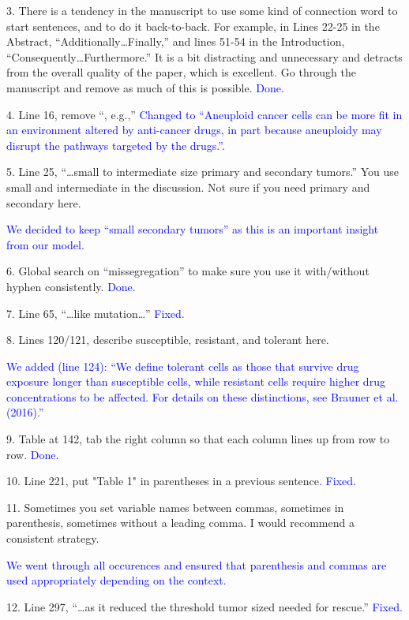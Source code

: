 \documentclass[12pt]{extarticle}
\begin{document}
3. There is a tendency in the manuscript to use some kind of connection word to start sentences, and to do it back-to-back. For example, in Lines 22-25 in the Abstract, ``Additionally\ldots Finally,'' and lines 51-54 in the Introduction, ``Consequently\ldots Furthermore.'' It is a bit distracting and unnecessary and detracts from the overall quality of the paper, which is excellent. Go through the manuscript and remove as much of this is possible.
\textcolor{blue}{Done.} %



4. Line 16, remove ``, e.g.,''
\textcolor{blue}{Changed to ``Aneuploid cancer cells can be more fit in an environment altered by anti-cancer drugs, in part because aneuploidy may disrupt the pathways  targeted by the drugs.''.} 


5. Line 25, ``\ldots small to intermediate size primary and secondary tumors.'' You use small and intermediate in the discussion. Not sure if you need primary and secondary here.

\textcolor{blue}{We decided to keep ``small secondary tumors'' as this is an important insight from our model.} 


6. Global search on ``missegregation'' to make sure you use it with/without hyphen consistently.
\textcolor{blue}{Done.}

7. Line 65, ``\dots like mutation\ldots''
\textcolor{blue}{Fixed.}


8. Lines 120/121, describe susceptible, resistant, and tolerant here.

\textcolor{blue}{We added (line 124): ``We define tolerant cells as those that survive drug exposure longer than susceptible cells, while resistant cells require higher drug concentrations to be affected. For details on these distinctions, see Brauner et al. (2016).''} %


9. Table at 142, tab the right column so that each column lines up from row to row.
\textcolor{blue}{Done.}


10. Line 221, put "Table 1" in parentheses in a previous sentence.
\textcolor{blue}{Fixed.}


11. Sometimes you set variable names between commas, sometimes in parenthesis, sometimes without a leading comma. I would recommend a consistent strategy.

\textcolor{blue}{We went through all occurences and ensured that parenthesis and commas are used appropriately depending on the context.}


12. Line 297, ``\ldots as it reduced the threshold tumor sized needed for rescue.''
\textcolor{blue}{Fixed.} %
\end{document}
